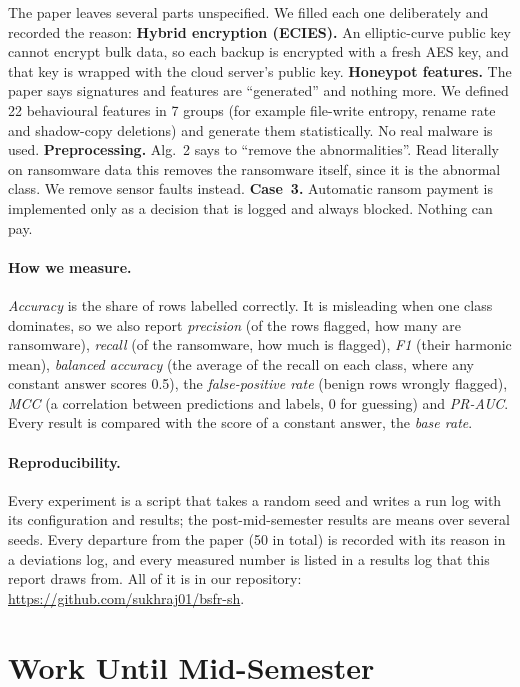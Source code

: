 \documentclass[11pt]{article}
\begin{document}
The paper leaves several parts unspecified. We filled each one deliberately and recorded the
reason:
\textbf{Hybrid encryption (ECIES).} An elliptic-curve public key cannot encrypt bulk data, so each
backup is encrypted with a fresh AES key, and that key is wrapped with the cloud server's public
key.
\textbf{Honeypot features.} The paper says signatures and features are ``generated'' and nothing
more. We defined 22 behavioural features in 7 groups (for example file-write entropy, rename rate
and shadow-copy deletions) and generate them statistically. No real malware is used.
\textbf{Preprocessing.} Alg.~2 says to ``remove the abnormalities''. Read literally on ransomware
data this removes the ransomware itself, since it is the abnormal class. We remove sensor faults
instead.
\textbf{Case~3.} Automatic ransom payment is implemented only as a decision that is logged and
always blocked. Nothing can pay.

\paragraph{How we measure.} \emph{Accuracy} is the share of rows labelled correctly. It is
misleading when one class dominates, so we also report \emph{precision} (of the rows flagged, how
many are ransomware), \emph{recall} (of the ransomware, how much is flagged), \emph{F1} (their
harmonic mean), \emph{balanced accuracy} (the average of the recall on each class, where any
constant answer scores 0.5), the \emph{false-positive rate} (benign rows wrongly flagged),
\emph{MCC} (a correlation between predictions and labels, 0 for guessing) and \emph{PR-AUC}.
Every result is compared with the score of a constant answer, the \emph{base rate}.

\paragraph{Reproducibility.} Every experiment is a script that takes a random seed and writes a run
log with its configuration and results; the post-mid-semester results are means over several seeds. Every
departure from the paper (50 in total) is recorded with its reason in a deviations log, and every
measured number is listed in a results log that this report draws from. All of it is in our
repository: \url{https://github.com/sukhraj01/bsfr-sh}.

\section{Work Until Mid-Semester}
\label{sec:mid}
\end{document}
